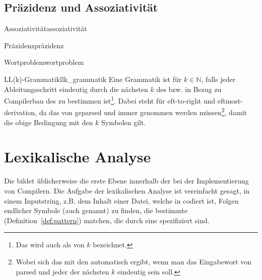 \subsection{Präzidenz und Assoziativität}
\begin{Definition}{Assoziativität}{assoziativität}
\end{Definition}
\begin{Definition}{Präzidenz}{präzidenz}
\end{Definition}
\begin{Definition}{Wortproblem}{wortproblem}
\end{Definition}
\begin{Definition}{LL(k)-Grammatik}{llk_grammatik}
  Eine Grammatik ist  für $k\in\mathbb{N}$, falls jeder Ableitungsschritt eindeutig durch die nächsten $k$  des  bzw. in Bezug zu Compilerbau  des  zu bestimmen ist\footnote{Das wird auch als  von $k$ bezeichnet.}. Dabei steht  für eft-to-right und eftmost-derivation, da das  von  geparsed und immer  genommen werden müssen\footnote{Wobei sich das mit den  automatisch ergibt, wenn man das Eingabewort von   parsed und jeder der nächsten $k$  eindeutig sein soll.}, damit die obige Bedingung mit den  $k$ Symbolen gilt.
\end{Definition}
\section{Lexikalische Analyse}
\label{sec:lexikalische_analyse}

Die  bildet üblicherweise die erste Ebene innerhalb der  bei der Implementierung von Compilern. Die Aufgabe der lexikalischen Analyse ist vereinfacht gesagt, in einem Inputstring, z.B. dem Inhalt einer Datei, welche in  codiert ist, Folgen endlicher Symbole (auch  genannt) zu finden, die bestimmte  (Definition~\ref{def:pattern}) matchen, die durch eine  spezifiziert sind.

